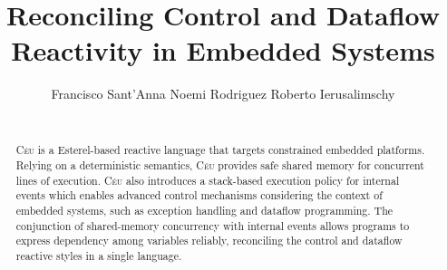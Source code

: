 \documentclass{acm_proc_article-sp}
\newcommand{\CEU}{\textsc{C\'{e}u}\xspace}
\newcommand{\1}{\;}
\newcommand{\2}{\;\;}
\newcommand{\3}{\;\;\;}
\newcommand{\5}{\;\;\;\;\;}
\begin{document}

\title {
    Reconciling Control and Dataflow Reactivity in Embedded Systems
}

\author{
    \alignauthor
    Francisco Sant'Anna \hspace{1cm} Noemi Rodriguez \hspace{1cm} Roberto Ierusalimschy   \\
     \\
}

\maketitle

\begin{abstract}
\CEU is a Esterel-based reactive language that targets constrained embedded 
platforms.
%
Relying on a deterministic semantics, \CEU provides safe shared memory for 
concurrent lines of execution.
%
\CEU also introduces a stack-based execution policy for internal events which 
enables advanced control mechanisms considering the context of embedded 
systems, such as exception handling and dataflow programming.
%
The conjunction of shared-memory concurrency with internal events allows 
programs to express dependency among variables reliably, reconciling the 
control and dataflow reactive styles in a single language.
%
\end{abstract}

\end{document}
